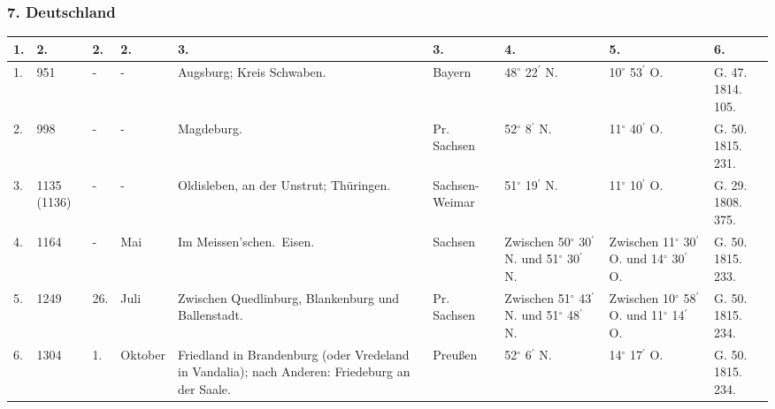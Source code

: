 \documentclass[a4paper, 8pt, oneside, polutonikogreek, german]{article}
\begin{document}
\begin{landscape}
\subsubsection{7. Deutschland}
\begin{table}[!ht]
    \centering
    \begin{tabular}{|p{5mm}|p{9mm}|p{5mm}|p{15mm}|p{48mm}|p{20mm}|p{18mm}|p{18mm}|p{11mm}|}
    \hline
        1. & 2. & 2. & 2. & 3. & 3. & 4. & 5. & 6. \\ \hline
        1. & 951 & - & - & Augsburg; Kreis Schwaben. & Bayern & 48$^\circ$ 22$^\prime$ N. & 10$^\circ$ 53$^\prime$ O. & G. 47. 1814. 105. \\ \hline
        2. & 998 & - & - & Magdeburg. & Pr. Sachsen & 52$^\circ$ 8$^\prime$ N. & 11$^\circ$ 40$^\prime$ O. & G. 50. 1815. 231. \\ \hline
        3. & 1135 (1136) & - & - & Oldisleben, an der Unstrut; Thüringen. & Sachsen-Weimar & 51$^\circ$ 19$^\prime$ N. & 11$^\circ$ 10$^\prime$ O. & G. 29. 1808. 375. \\ \hline
        4. & 1164 & - & Mai & Im Meissen’schen. Eisen. & Sachsen & Zwischen 50$^\circ$ 30$^\prime$ N. und 51$^\circ$ 30$^\prime$ N. & Zwischen 11$^\circ$ 30$^\prime$ O. und 14$^\circ$ 30$^\prime$ O. & G. 50. 1815. 233. \\ \hline
        5. & 1249 & 26. & Juli & Zwischen Quedlinburg, Blankenburg und Ballenstadt. & Pr. Sachsen & Zwischen 51$^\circ$ 43$^\prime$ N. und 51$^\circ$ 48$^\prime$ N. & Zwischen 10$^\circ$ 58$^\prime$ O. und 11$^\circ$ 14$^\prime$ O. & G. 50. 1815. 234. \\ \hline
        6. & 1304 & 1. & Oktober & Friedland in Brandenburg (oder Vredeland in Vandalia); nach Anderen: Friedeburg an der Saale. & Preußen & 52$^\circ$ 6$^\prime$ N. & 14$^\circ$ 17$^\prime$ O. & G. 50. 1815. 234. \\ \hline
    \end{tabular}
\end{table}
\end{landscape}
\clearpage
\end{document}

